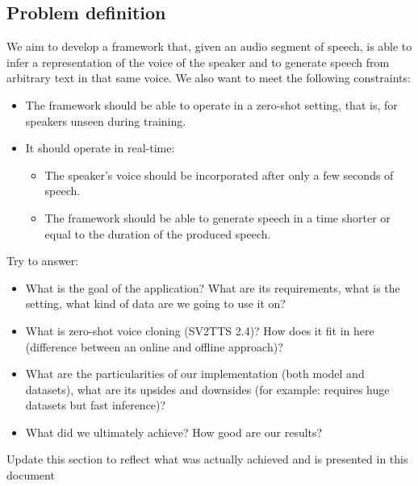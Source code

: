 \documentclass[a4paper, oneside, 12pt, english]{article}
\begin{document}
\subsection{Problem definition}
We aim to develop a framework that, given an audio segment of speech, is able to infer a representation of the voice of the speaker and to generate speech from arbitrary text in that same voice. We also want to meet the following constraints:
\begin{itemize}
	\item The framework should be able to operate in a zero-shot setting, that is, for speakers unseen during training.
	\item It should operate in real-time:
	\begin{itemize}
		\item The speaker's voice should be incorporated after only a few seconds of speech.
		\item The framework should be able to generate speech in a time shorter or equal to the duration of the produced speech.
	\end{itemize}
\end{itemize}

Try to answer:
\begin{itemize}
	\item What is the goal of the application? What are its requirements, what is the setting, what kind of data are we going to use it on?
	\item What is zero-shot voice cloning (SV2TTS 2.4)? How does it fit in here (difference between an online and offline approach)?
	\item What are the particularities of our implementation (both model and datasets), what are its upsides and downsides (for example: requires huge datasets but fast inference)?
	\item What did we ultimately achieve? How good are our results?
\end{itemize}


\color{red} Update this section to reflect what was actually achieved and is presented in this document \color{black}
\end{document}
